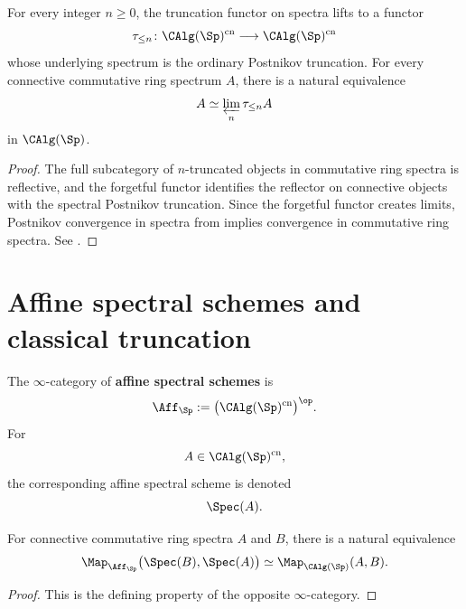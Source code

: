 \begin{proposition}
\label{prop:operadic-postnikov-truncations}
For every integer $n\geq0$, the truncation functor on spectra lifts to a
functor
\[
    \tau_{\leq n}
    \colon
    \CAlg(\Sp)^{\mathrm{cn}}
    \longrightarrow
    \CAlg(\Sp)^{\mathrm{cn}}
\]
whose underlying spectrum is the ordinary Postnikov truncation. For every
connective commutative ring spectrum $A$, there is a natural equivalence
\[
    A
    \simeq
    \varprojlim_n\tau_{\leq n}A
\]
in $\CAlg(\Sp)$.
\end{proposition}

\begin{proof}
The full subcategory of $n$-truncated objects in commutative ring spectra
is reflective, and the forgetful functor identifies the reflector on
connective objects with the spectral Postnikov truncation. Since the
forgetful functor creates limits, Postnikov convergence in spectra from
 implies convergence in
commutative ring spectra. See \cite{LurieHigherAlgebra,LurieDAGIV}.
\end{proof}

\section{Affine spectral schemes and classical truncation}
\label{sec:affine-spectral-schemes}

\begin{definition}
\label{def:affine-spectral-scheme}
The $\infty$-category of \textbf{affine spectral schemes} is
\[
    \Aff_{\Sp}
    :=
    \bigl(\CAlg(\Sp)^{\mathrm{cn}}\bigr)^{\op}.
\]
For
\[
    A\in\CAlg(\Sp)^{\mathrm{cn}},
\]
the corresponding affine spectral scheme is denoted
\[
    \Spec(A).
\]
\end{definition}

\begin{proposition}
\label{prop:affine-spectral-mapping-spaces}
For connective commutative ring spectra $A$ and $B$, there is a natural
equivalence
\[
    \Map_{\Aff_{\Sp}}
    \bigl(
        \Spec(B),
        \Spec(A)
    \bigr)
    \simeq
    \Map_{\CAlg(\Sp)}(A,B).
\]
\end{proposition}

\begin{proof}
This is the defining property of the opposite $\infty$-category.
\end{proof}

